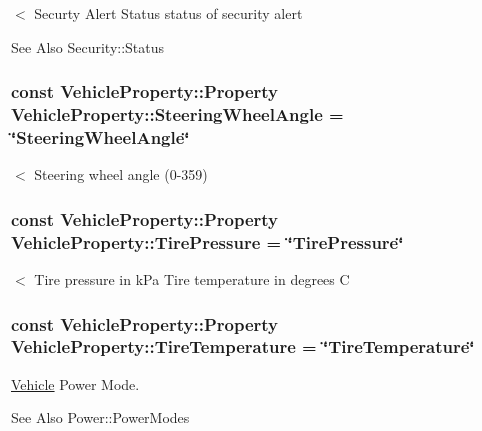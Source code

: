 $<$ Securty Alert Status status of security alert \begin{DoxySeeAlso}{See Also}
Security\-::\-Status 
\end{DoxySeeAlso}
\hypertarget{classVehicleProperty_aba4832663e4f850acbcf09c7cfbc6959}{
\subsubsection[{Steering\-Wheel\-Angle}]{\setlength{\rightskip}{0pt plus 5cm}const Vehicle\-Property\-::\-Property Vehicle\-Property\-::\-Steering\-Wheel\-Angle = \char`\"{}Steering\-Wheel\-Angle\char`\"{}\hspace{0.3cm}{\ttfamily [static]}}}\label{classVehicleProperty_aba4832663e4f850acbcf09c7cfbc6959}
$<$ Steering wheel angle (0-\/359) \hypertarget{classVehicleProperty_a4709c7da616ca84dd4533562319d9bb8}{
\subsubsection[{Tire\-Pressure}]{\setlength{\rightskip}{0pt plus 5cm}const Vehicle\-Property\-::\-Property Vehicle\-Property\-::\-Tire\-Pressure = \char`\"{}Tire\-Pressure\char`\"{}\hspace{0.3cm}{\ttfamily [static]}}}\label{classVehicleProperty_a4709c7da616ca84dd4533562319d9bb8}
$<$ Tire pressure in k\-Pa Tire temperature in degrees C \hypertarget{classVehicleProperty_a6ec2a936e26226d1cb9fb84262e6adc2}{
\subsubsection[{Tire\-Temperature}]{\setlength{\rightskip}{0pt plus 5cm}const Vehicle\-Property\-::\-Property Vehicle\-Property\-::\-Tire\-Temperature = \char`\"{}Tire\-Temperature\char`\"{}\hspace{0.3cm}{\ttfamily [static]}}}\label{classVehicleProperty_a6ec2a936e26226d1cb9fb84262e6adc2}
\hyperlink{namespaceVehicle}{Vehicle} Power Mode. \begin{DoxySeeAlso}{See Also}
Power\-::\-Power\-Modes 
\end{DoxySeeAlso}
